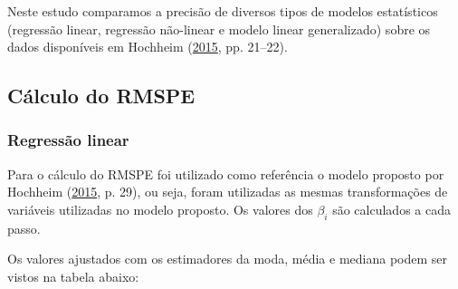 \documentclass[a4paper]{article}
\begin{document}
Neste estudo comparamos a precisão de diversos tipos de modelos
estatísticos (regressão linear, regressão não-linear e modelo linear
generalizado) sobre os dados disponíveis em Hochheim
(\protect\hyperlink{ref-hochheim}{2015}, pp. 21--22).

\subsection{Cálculo do RMSPE}\label{calculo-do-rmspe}

\subsubsection{Regressão linear}\label{regressao-linear-2}

Para o cálculo do RMSPE foi utilizado como referência o modelo proposto
por Hochheim (\protect\hyperlink{ref-hochheim}{2015}, p. 29), ou seja,
foram utilizadas as mesmas transformações de variáveis utilizadas no
modelo proposto. Os valores dos \(\beta_i\) são calculados a cada passo.

Os valores ajustados com os estimadores da moda, média e mediana podem
ser vistos na tabela abaixo:

\end{document}
